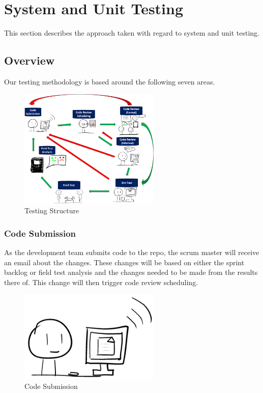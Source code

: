 
\chapter{System  and Unit Testing}

This section describes the approach taken with regard to system and unit testing. 

\section{Overview}
Our testing methodology is based around the following seven areas.

\begin{figure}[tbh]
\begin{center}
\includegraphics[width=0.6\textwidth]{resources/diagram/Testing}
\end{center}
\caption{Testing Structure \label{systemdiagram}}
\end{figure}

\subsection{Code Submission}
As the development team submits code to the repo, the scrum master will receive an email about the changes. These changes will be based on either the sprint backlog or field test analysis and the changes needed to be made from the results there of.  This change will then trigger code review scheduling.

\begin{figure}[tbh]
\begin{center}
\includegraphics[width=0.6\textwidth]{resources/img/Submission}
\end{center}
\caption{Code Submission \label{systemdiagram}}
\end{figure}


